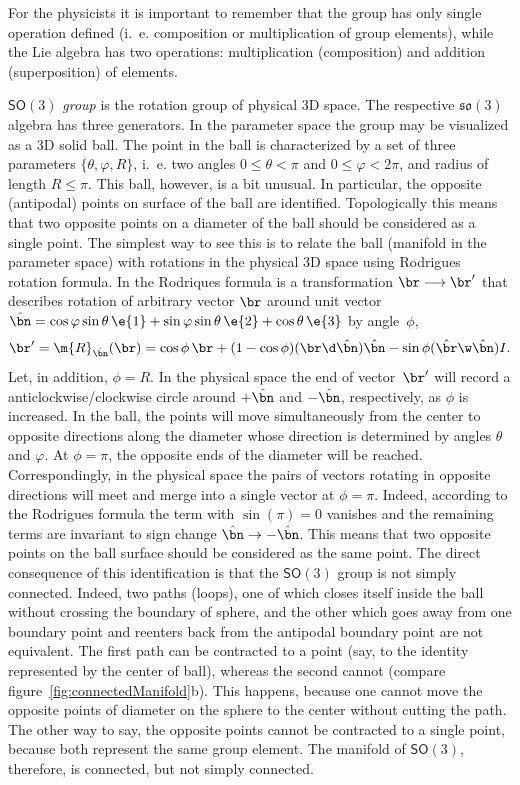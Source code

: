 %
\vspace{2mm}
 For the physicists it is important to remember that
the group has only single operation defined (i.~e. composition or
multiplication of group elements), while the Lie algebra has two
operations: multiplication (composition) and addition
(superposition) of elements.
%
\begin{example} 
$\mathsf{SO}(3)$ \textit{group} is the rotation group of physical
3D space. The respective $\mathfrak{so}(3)$ algebra has three
generators. In the  parameter space the group may be visualized as
a 3D solid ball. The point in the ball is characterized by a set of three
parameters $\{\theta,\varphi,R\}$, i.~e. two angles $0\le\theta<\pi$ and $0\le\varphi<2\pi$, 
and radius
of length $R\le\pi$. This ball, however, is a bit unusual. In
particular, the opposite (antipodal) points on surface of the ball
are identified. Topologically this means that two opposite points
on a diameter of the ball should be considered as a single point.
The simplest way to see this is to relate the ball (manifold in
the parameter space) with  rotations in the physical 3D space
using Rodrigues rotation formula. In  the Rodriques
formula is a transformation $\br\longrightarrow\br^{\prime}$ that
describes rotation  of arbitrary  vector $\br$ around unit vector
$\hat{\bn}=\cos\varphi \sin\theta\,\e{1}+\sin\varphi
\sin\theta\,\e{2}+ \cos\theta\,\e{3}$ by angle~$\phi$,
\[
  \br^{\prime}=\m{R}_{\hat{\bn}}(\br)=\cos\phi\,\br + (1-\cos\phi)(\br\d\hat{\bn})\hat{\bn}
  -\sin\phi(\hat{\br}\w\hat{\bn})I.
\]
Let, in addition, $\phi=R$. In the physical space the end of
vector~$\br^{\prime}$ will record a anticlockwise/clockwise circle
around $+\hat{\bn}$ and $-\hat{\bn}$, respectively,  as $\phi$ is
increased. In the ball,  the points  will move simultaneously from
the center to opposite directions along the diameter whose
direction is determined by angles $\theta$ and $\varphi$. At
$\phi=\pi$, the opposite  ends of the diameter will be reached.
Correspondingly, in the physical space the pairs of vectors
rotating in opposite directions will meet and merge into a single
vector at $\phi=\pi$. Indeed, according to the Rodrigues formula
the term with $\sin(\pi)=0$ vanishes and the remaining terms are
invariant to sign change $\hat{\bn}\rightarrow -\hat{\bn}$. This
means that two opposite points on the ball surface  should be
considered as the same point. The direct consequence of this
identification is that the $\mathsf{SO}(3)$ group  is not simply
connected. Indeed, two paths (loops), one of which closes itself
inside the ball without crossing the boundary of sphere, and the
other which goes away from one boundary point and reenters back from
the antipodal boundary point are not equivalent. The first path
can be contracted to a point (say, to the identity represented by
the center of ball), whereas the second cannot (compare
figure~\ref{fig:connectedManifold}b). This happens, because one
cannot move the opposite points of diameter on the sphere to the
center without cutting the path. The other way to say, the
opposite points cannot be contracted to a single point, because
both represent the same group element. The manifold of
$\mathsf{SO}(3)$, therefore, is connected, but not simply connected.


\end{example}
